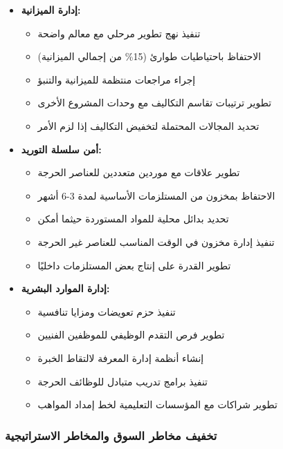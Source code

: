 \begin{itemize}
    \item \textbf{إدارة الميزانية:}
    \begin{itemize}
        \item تنفيذ نهج تطوير مرحلي مع معالم واضحة
        \item الاحتفاظ باحتياطيات طوارئ (15\% من إجمالي الميزانية)
        \item إجراء مراجعات منتظمة للميزانية والتنبؤ
        \item تطوير ترتيبات تقاسم التكاليف مع وحدات المشروع الأخرى
        \item تحديد المجالات المحتملة لتخفيض التكاليف إذا لزم الأمر
    \end{itemize}
    
    \item \textbf{أمن سلسلة التوريد:}
    \begin{itemize}
        \item تطوير علاقات مع موردين متعددين للعناصر الحرجة
        \item الاحتفاظ بمخزون من المستلزمات الأساسية لمدة 3-6 أشهر
        \item تحديد بدائل محلية للمواد المستوردة حيثما أمكن
        \item تنفيذ إدارة مخزون في الوقت المناسب للعناصر غير الحرجة
        \item تطوير القدرة على إنتاج بعض المستلزمات داخليًا
    \end{itemize}
    
    \item \textbf{إدارة الموارد البشرية:}
    \begin{itemize}
        \item تنفيذ حزم تعويضات ومزايا تنافسية
        \item تطوير فرص التقدم الوظيفي للموظفين الفنيين
        \item إنشاء أنظمة إدارة المعرفة لالتقاط الخبرة
        \item تنفيذ برامج تدريب متبادل للوظائف الحرجة
        \item تطوير شراكات مع المؤسسات التعليمية لخط إمداد المواهب
    \end{itemize}
\end{itemize}

\subsubsection{تخفيف مخاطر السوق والمخاطر الاستراتيجية}

